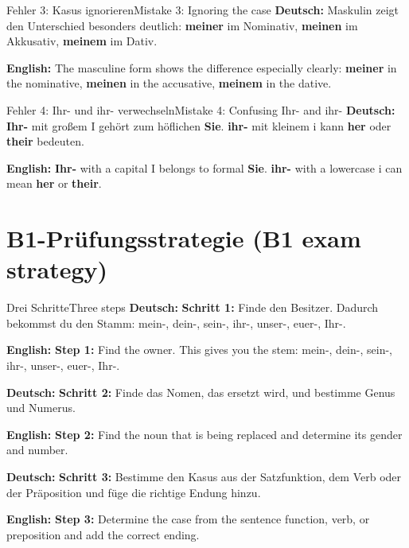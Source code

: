 \documentclass[a4paper,11pt]{article}
\newcommand{\GermanText}[1]{\textbf{Deutsch: }#1\par}
\newcommand{\EnglishText}[1]{{\small\color{SoftGray}\textbf{English: }#1\par}}
\begin{document}
        \begin{grammarentry}{Fehler 3: Kasus ignorieren}{Mistake 3: Ignoring the case}
            \GermanText{Maskulin zeigt den Unterschied besonders deutlich: \textbf{meiner} im Nominativ, \textbf{meinen} im Akkusativ, \textbf{meinem} im Dativ.}
            \EnglishText{The masculine form shows the difference especially clearly: \textbf{meiner} in the nominative, \textbf{meinen} in the accusative, \textbf{meinem} in the dative.}
        \end{grammarentry}

        \begin{grammarentry}{Fehler 4: Ihr- und ihr- verwechseln}{Mistake 4: Confusing Ihr- and ihr-}
            \GermanText{\textbf{Ihr-} mit großem I gehört zum höflichen \textbf{Sie}. \textbf{ihr-} mit kleinem i kann \textbf{her} oder \textbf{their} bedeuten.}
            \EnglishText{\textbf{Ihr-} with a capital I belongs to formal \textbf{Sie}. \textbf{ihr-} with a lowercase i can mean \textbf{her} or \textbf{their}.}
        \end{grammarentry}

    \section{B1-Prüfungsstrategie \textnormal{(B1 exam strategy)}}

        \begin{grammarentry}{Drei Schritte}{Three steps}
            \GermanText{\textbf{Schritt 1:} Finde den Besitzer. Dadurch bekommst du den Stamm: mein-, dein-, sein-, ihr-, unser-, euer-, Ihr-.}
            \EnglishText{\textbf{Step 1:} Find the owner. This gives you the stem: mein-, dein-, sein-, ihr-, unser-, euer-, Ihr-.}

            \GermanText{\textbf{Schritt 2:} Finde das Nomen, das ersetzt wird, und bestimme Genus und Numerus.}
            \EnglishText{\textbf{Step 2:} Find the noun that is being replaced and determine its gender and number.}

            \GermanText{\textbf{Schritt 3:} Bestimme den Kasus aus der Satzfunktion, dem Verb oder der Präposition und füge die richtige Endung hinzu.}
            \EnglishText{\textbf{Step 3:} Determine the case from the sentence function, verb, or preposition and add the correct ending.}
        \end{grammarentry}
\end{document}
